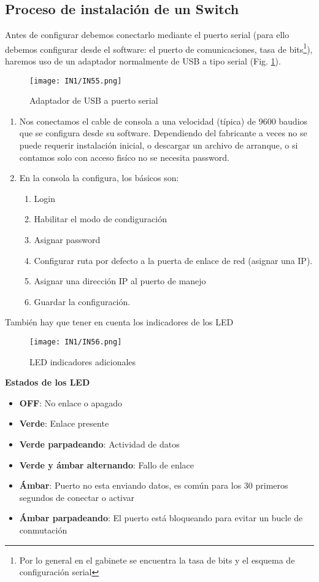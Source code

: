 \documentclass[
	12pt, %
	fleqn, %
	a4paper, %
]{LegrandOrangeBook}
\begin{document}
\subsection{Proceso de instalación de un Switch}
Antes de configurar debemos conectarlo mediante el puerto serial (para ello debemos configurar desde el software: el puerto de comunicaciones, tasa de bits\footnote{Por lo general en el gabinete se encuentra la tasa de bits y el esquema de configuración serial}), haremos uso de un adaptador normalmente de USB a tipo serial (Fig. \ref{fig:cable usb serial}).
\begin{figure}[H]
\centering
\texttt{[image: IN1/IN55.png]}
\caption{Adaptador de USB a puerto serial}
\label{fig:cable usb serial}
\end{figure}
\begin{enumerate}
\item Nos conectamos el cable de consola a una velocidad (típica) de 9600 baudios que se configura desde su software. Dependiendo del fabricante a veces no se puede requerir instalación inicial, o descargar un archivo de arranque, o si contamos solo con acceso fisíco no se necesita password.
\item En la consola la configura, los básicos son:
\begin{enumerate}
\item Login
\item Habilitar el modo de condiguración
\item Asignar password
\item Configurar ruta por defecto a la puerta de enlace de red (asignar una IP).
\item Asignar una dirección IP al puerto de manejo
\item Guardar la configuración.
\end{enumerate}
\end{enumerate}
También hay que tener en cuenta los indicadores de los LED
\begin{figure}[H]
\centering
\texttt{[image: IN1/IN56.png]}
\caption{LED indicadores adicionales}
\end{figure}
\textbf{Estados de los LED}\\
\begin{itemize}
\item \textbf{OFF}: No enlace o apagado
\item \textbf{Verde}: Enlace presente
\item \textbf{Verde parpadeando}: Actividad de datos
\item \textbf{Verde y ámbar alternando}: Fallo de enlace
\item \textbf{Ámbar}: Puerto no esta enviando datos, es común para los 30 primeros segundos de conectar o activar
\item \textbf{Ámbar parpadeando}: El puerto está bloqueando para evitar un bucle de conmutación
\end{itemize}
\end{document}
